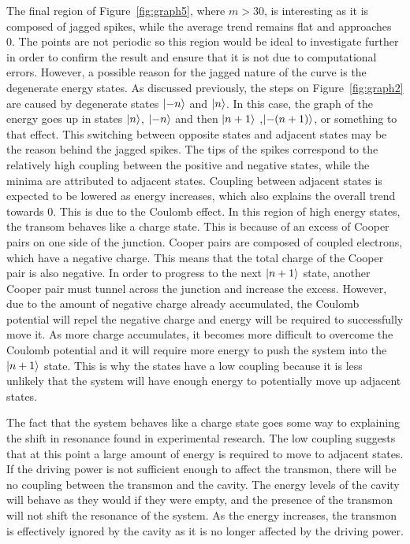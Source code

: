\documentclass[11pt]{article}
\begin{document}
The final region of Figure~\ref{fig:graph5}, where $m>30$, is interesting as it is composed of jagged spikes, while the average trend remains flat and approaches 0. The points are not periodic so this region would be ideal to investigate further in order to confirm the result and ensure that it is not due to computational errors. However, a possible reason for the jagged nature of the curve is the degenerate energy states. As discussed previously, the steps on Figure~\ref{fig:graph2} are caused by degenerate states $\ket{-n}$ and $\ket{n}$. In this case, the graph of the energy goes up in states $\ket{n}$, $\ket{-n}$ and then $\ket{n+1}$ ,$\ket{-(n+1)}$, or something to that effect. This switching between opposite states and adjacent states may be the reason behind the jagged spikes. The tips of the spikes correspond to the relatively high coupling between the positive and negative states, while the minima are attributed to adjacent states. Coupling between adjacent states is expected to be lowered as energy increases, which also explains the overall trend towards 0. This is due to the Coulomb effect. In this region of high energy states, the transom behaves like a charge state. This is because of an excess of Cooper pairs on one side of the junction. Cooper pairs are composed of coupled electrons, which have a negative charge. This means that the total charge of the Cooper pair is also negative. In order to progress to the next $\ket{n+1}$ state, another Cooper pair must tunnel across the junction and increase the excess. However, due to the amount of negative charge already accumulated, the Coulomb potential will repel the negative charge and energy will be required to successfully move it. As more charge accumulates, it becomes more difficult to overcome the Coulomb potential and it will require more energy to push the system into the $\ket{n+1}$ state. This is why the states have a low coupling because it is less unlikely that the system will have enough energy to potentially move up adjacent states.

The fact that the system behaves like a charge state goes some way to explaining the shift in resonance found in experimental research. The low coupling suggests that at this point a large amount of energy is required to move to adjacent states. If the driving power is not sufficient enough to affect the transmon, there will be no coupling between the transmon and the cavity. The energy levels of the cavity will behave as they would if they were empty, and the presence of the transmon will not shift the resonance of the system. As the energy increases, the transmon is effectively ignored by the cavity as it is no longer affected by the driving power.
\end{document}
